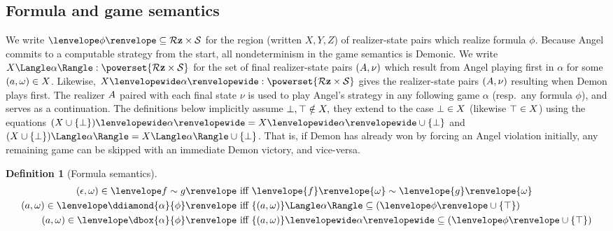 \documentclass[12pt]{cmuthesis}
\theoremstyle{definition}
\newtheorem{definition}{Definition}
\theoremstyle{remark}
\newcommand{\allstate}{\mathcal{S}}
\newcommand{\om}{\omega}
\newcommand{\tint}[2]{\lenvelope{#1}\renvelope{#2}}
\begin{document}
\subsection{Formula and game semantics}
We write $\fintR{\phi} \subseteq \allRz \times \allstate$ for the region (written $X,Y,Z$) of realizer-state pairs which realize formula $\phi$.
Because Angel commits to a computable strategy from the start, all nondeterminism in the game semantics is Demonic.
We write $\strategyforR[\alpha]{X} : \powerset{\allRz \times \allstate}$ for the set of final realizer-state pairs $(A,\nu)$ which result from Angel playing first in $\alpha$ for some $(\aa,\om) \in X$.
Likewise, $\dstrategyforR[\alpha]{X} : \powerset{\allRz \times \allstate}$ gives the realizer-state pairs $(A,\nu)$ resulting when Demon plays first.
The realizer $A$ paired with each final state $\nu$ is used to play Angel's strategy in any following game $\alpha$ (resp.\ any formula $\phi$), and serves as a continuation.
The definitions below implicitly assume $\bot, \top \notin X,$ they extend to the case $\bot \in X$ (likewise $\top \in X$) using the equations 
$\dstrategyforR[\alpha]{(X \cup \{\sff\})} = \dstrategyforR[\alpha]{X} \cup\{\sff\}$ and 
$\strategyforR[\alpha]{(X \cup \{\sff\})} = \strategyforR[\alpha]{X} \cup\{\sff\}$.
That is, if Demon has already won by forcing an Angel violation initially, any remaining game can be skipped with an immediate Demon victory, and vice-versa.
\begin{definition}[Formula semantics]
\begin{align*}
(\rzNil,\om) \in  \fintR{f \sim g}                 &\text{ iff } \tint{f}{\om} \sim \tint{g}{\om}\\
(\aa,\om) \in  \fintR{\ddiamond{\alpha}{\phi}}       &\text{ iff } \strategyforR[\alpha]{\{(\aa,\om)\}} \subseteq (\fintR{\phi} \cup \{\stt\})\\
(\aa,\om) \in  \fintR{\dbox{\alpha}{\phi}}              &\text{ iff } \dstrategyforR[\alpha]{\{(\aa,\om)\}} \subseteq (\fintR{\phi} \cup \{\stt\})
\end{align*}
\end{definition}
\end{document}
